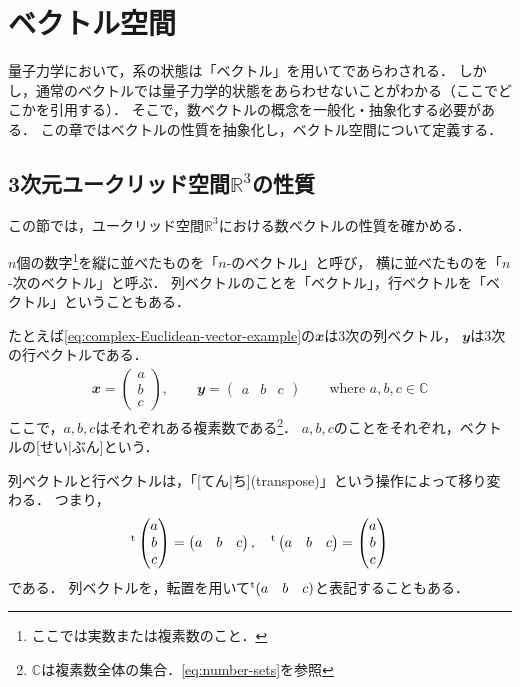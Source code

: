 \documentclass[../sotsu.tex]{subfiles}
\begin{document}
\section{ベクトル空間}
\label{sec:vector-space}

量子力学において，系の状態は「ベクトル」を用いてであらわされる．
しかし，通常のベクトルでは量子力学的状態をあらわせないことがわかる（ここでどこかを引用する）．
そこで，数ベクトルの概念を一般化・抽象化する必要がある．
この章ではベクトルの性質を抽象化し，ベクトル空間について定義する．


\subsection{3次元ユークリッド空間$ℝ^3$の性質}

この節では，ユークリッド空間$ℝ^3$における数ベクトルの性質を確かめる．

$n$個の数字\footnote{ここでは実数または複素数のこと．}を縦に並べたものを「$n$-のベクトル」と呼び，
横に並べたものを「$n$-次のベクトル」と呼ぶ\cite{miyake-lin-2008}．
列ベクトルのことを「ベクトル」，行ベクトルを「ベクトル」ということもある．

たとえば\cref{eq:complex-Euclidean-vector-example}の$𝒙$は3次の列ベクトル，
$𝒚$は3次の行ベクトルである．
\begin{align}
    \label{eq:complex-Euclidean-vector-example}
    𝒙 = 
    \begin{pmatrix}
        a  \\  b  \\  c
    \end{pmatrix}
    , \qquad
    𝒚 = 
    \begin{pmatrix}
        a  &  b  &  c
    \end{pmatrix}
    \qquad 
    \text{where $a, b, c ∈ ℂ$}
\end{align}
ここで，$a, b, c$はそれぞれある複素数である\footnote{$ℂ$は複素数全体の集合．\cref{eq:number-sets}を参照}．
$a, b, c$のことをそれぞれ，ベクトルの[せい|ぶん]という．

列ベクトルと行ベクトルは，「[てん|ち](transpose)」という操作によって移り変わる．
つまり，
\begin{equation*}
    {}^{\mathrm{t}}\begin{pmatrix}
        a  \\  b  \\  c
    \end{pmatrix}
    =
    \begin{pmatrix}
        a  &  b  &  c
    \end{pmatrix},
    \quad
    {}^{\mathrm{t}}\begin{pmatrix}
        a  &  b  &  c
    \end{pmatrix}
    =
    \begin{pmatrix}
        a  \\  b  \\  c
    \end{pmatrix}
\end{equation*}
である．
列ベクトルを，転置を用いて${}^{\mathrm{t}}(a \quad b \quad c)$と表記することもある．
\end{document}
